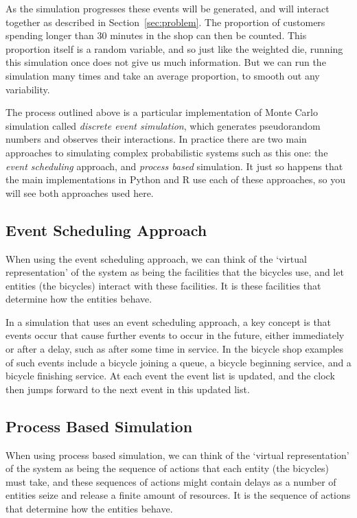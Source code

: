As the simulation progresses these events will be generated, and will interact
together as described in Section~\ref{sec:problem}.
The proportion of customers spending longer than 30 minutes in the shop can then
be counted. This proportion itself is a random variable, and so just like the
weighted die, running this simulation once does not give us much information.
But we can run the simulation many times and take an average proportion, to
smooth out any variability.

The process outlined above is a particular implementation of Monte Carlo
simulation called \textit{discrete event simulation}, which generates
pseudorandom numbers and observes their interactions. In practice there are two
main approaches to simulating complex probabilistic systems such as this one:
the \textit{event scheduling} approach, and \textit{process based} simulation.
It just so happens that the main implementations in Python and R use each of
these approaches, so you will see both approaches used here.


\subsection{Event Scheduling Approach}
When using the event scheduling approach, we can think of the `virtual
representation' of the system as being the facilities that the bicycles use, and
let entities (the bicycles) interact with these facilities. It is these
facilities that determine how the entities behave.

In a simulation that uses an event scheduling approach, a key concept is that
events occur that cause further events to occur in the future, either
immediately or after a delay, such as after some time in service.
In the bicycle shop examples of such events include a bicycle joining a queue, a
bicycle beginning service, and a bicycle finishing service. At each event the
event list is updated, and the clock then jumps forward to the next event in
this updated list.

\subsection{Process Based Simulation}
When using process based simulation, we can think of the `virtual
representation' of the system as being the sequence of actions that each entity
(the bicycles) must take, and these sequences of actions might contain delays as
a number of entities seize and release a finite amount of resources. It is the
sequence of actions that determine how the entities behave.

